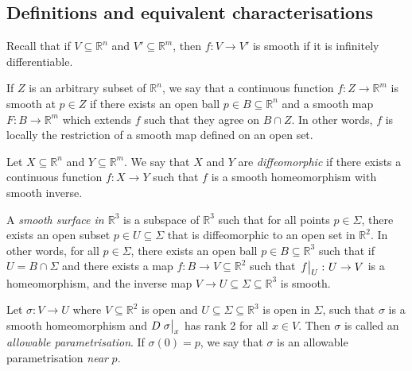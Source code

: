 \subsection{Definitions and equivalent characterisations}
Recall that if \( V \subseteq \mathbb R^n \) and \( V' \subseteq \mathbb R^m \), then \( f \colon V \to V' \) is smooth if it is infinitely differentiable.
\begin{definition}
	If \( Z \) is an arbitrary subset of \( \mathbb R^n \), we say that a continuous function \( f \colon Z \to \mathbb R^m \) is smooth at \( p \in Z \) if there exists an open ball \( p \in B \subseteq \mathbb R^n \) and a smooth map \( F \colon B \to \mathbb R^m \) which extends \( f \) such that they agree on \( B \cap Z \).
	In other words, \( f \) is locally the restriction of a smooth map defined on an open set.
\end{definition}
\begin{definition}
	Let \( X \subseteq \mathbb R^n \) and \( Y \subseteq \mathbb R^m \).
	We say that \( X \) and \( Y \) are \textit{diffeomorphic} if there exists a continuous function \( f \colon X \to Y \) such that \( f \) is a smooth homeomorphism with smooth inverse.
\end{definition}
\begin{definition}
	A \textit{smooth surface in \( \mathbb R^3 \)} is a subspace of \( \mathbb R^3 \) such that for all points \( p \in \Sigma \), there exists an open subset \( p \in U \subseteq \Sigma \) that is diffeomorphic to an open set in \( \mathbb R^2 \).
	In other words, for all \( p \in \Sigma \), there exists an open ball \( p \in B \subseteq \mathbb R^3 \) such that if \( U = B \cap \Sigma \) and there exists a map \( f \colon B \to V \subseteq \mathbb R^2 \) such that \( \eval{f}_U \colon U \to V \) is a homeomorphism, and the inverse map \( V \to U \subseteq \Sigma \subseteq \mathbb R^3 \) is smooth.
\end{definition}
\begin{definition}
	Let \( \sigma \colon V \to U \) where \( V \subseteq \mathbb R^2 \) is open and \( U \subseteq \Sigma \subseteq \mathbb R^3 \) is open in \( \Sigma \), such that \( \sigma \) is a smooth homeomorphism and \( D \eval{\sigma}_x \) has rank 2 for all \( x \in V \).
	Then \( \sigma \) is called an \textit{allowable parametrisation}.
	If \( \sigma(0) = p \), we say that \( \sigma \) is an allowable parametrisation \textit{near} \( p \).
\end{definition}
